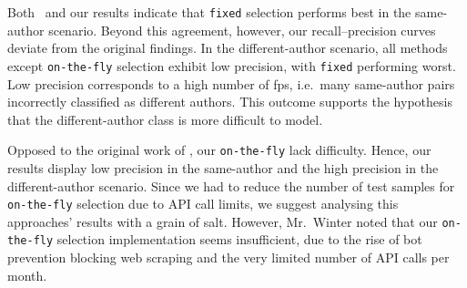 Both \citet{koppel_determining_2014}\ and our results indicate that \texttt{fixed} \imp{} selection performs best in the same-author scenario.
Beyond this agreement, however, our recall–precision curves deviate from the original findings.
In the different-author scenario, all methods except \texttt{on-the-fly} selection exhibit low precision, with \texttt{fixed} \imps{} performing worst.
Low precision corresponds to a high number of \acp{fp}, i.e.\ many same-author pairs incorrectly classified as different authors.
This outcome supports the hypothesis that the different-author class is more difficult to model.

Opposed to the original work of \citet{koppel_determining_2014}, our \texttt{on-the-fly} \imps{} lack difficulty.
Hence, our results display low precision in the same-author and the high precision in the different-author scenario.
Since we had to reduce the number of test samples for \texttt{on-the-fly} \imp{} selection due to API call limits, we suggest analysing this approaches' results with a grain of salt.
However, Mr.\ Winter noted that our \texttt{on-the-fly} \imp{} selection implementation seems insufficient, due to the rise of bot prevention blocking web scraping and the very limited number of API calls per month.
